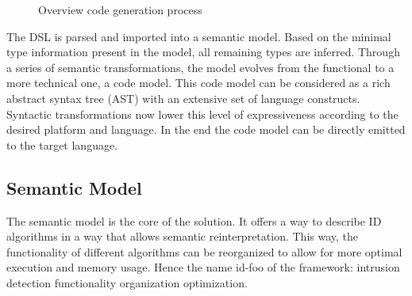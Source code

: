 \documentclass[conference]{IEEEtran}
\newcommand{\NAME}{id-foo\xspace}
\begin{document}
\begin{figure}[ht]
  \centering
\caption{Overview code generation process}
\label{fig:code-generation}
\end{figure}

The DSL is parsed and imported into a semantic model. Based on the minimal type
information present in the model, all remaining types are inferred. Through a
series of semantic transformations, the model evolves from the functional to a
more technical one, a code model. This code model can be considered as a rich
abstract syntax tree (AST) with an extensive set of language constructs.
Syntactic transformations now lower this level of expressiveness according to
the desired platform and language. In the end the code model can be directly
emitted to the target language.

\subsection*{Semantic Model}

The semantic model is the core of the solution. It offers a way to describe ID
algorithms in a way that allows semantic reinterpretation. This way, the
functionality of different algorithms can be reorganized to allow for more
optimal execution and memory usage. Hence the name \NAME of the framework:
intrusion detection functionality organization optimization.
\end{document}
